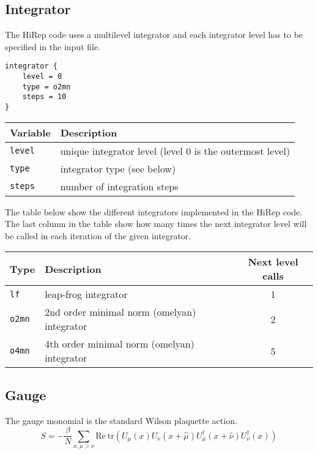 \documentclass[12pt]{article}
\begin{document}
\subsection*{Integrator}
The HiRep code uses a multilevel integrator and each integrator level has to be specified in the input file.
\begin{center}
\begin{minipage}{40mm}
\begin{framed}
\begin{verbatim}
integrator {
    level = 0
    type = o2mn
    steps = 10
}
\end{verbatim}
\vspace{-5mm}
\end{framed}
\end{minipage}
\end{center}

\vspace{2mm}

\begin{center}
\begin{tabular}{l|l}
 Variable & Description \\
 \hline
 \verb|level| & unique integrator level (level 0 is the outermost level) \\
 \verb|type|  & integrator type (see below) \\
 \verb|steps| & number of integration steps \\
\end{tabular}
\end{center}

The table below show the different integrators implemented in the HiRep code. The last column in the table show how many times the next integrator level will be called in each iteration of the given integrator.

\begin{center}
\begin{tabular}{l|lc}
 Type & Description & Next level calls \\
 \hline
 \verb|lf|   & leap-frog integrator & 1\\
 \verb|o2mn| & 2nd order minimal norm (omelyan) integrator & 2 \\
 \verb|o4mn| & 4th order minimal norm (omelyan) integrator & 5\\
\end{tabular}
\end{center}

\newpage
\subsection*{Gauge}
The gauge monomial is the standard Wilson plaquette action.
\begin{equation}
 S = -\frac{\beta}{N}\sum_{x,\mu>\nu} \textrm{Re}~\textrm{tr}(U_\mu(x)U_\nu(x+\hat{\mu})U_\mu^\dagger(x+\hat{\nu})U_\nu^\dagger(x))
\end{equation}
\end{document}
